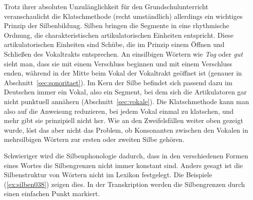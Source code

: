 Trotz ihrer absoluten Unzulänglichkeit für den Grundschulunterricht veranschaulicht die Klatschmethode (recht umständlich) allerdings ein wichtiges Prinzip der Silbenbildung.
Silben bringen die Segmente in eine rhythmische Ordnung, die charakteristischen artikulatorischen Einheiten entspricht.
Diese artikulatorischen Einheiten sind Schübe, die im Prinzip einem Öffnen und Schließen des Vokaltrakts entsprechen.
An einsilbigen Wörtern wie \textit{Tag} \textipa{[ta:k]} oder \textit{gut} \textipa{[gu:t]} sieht man, dass sie mit einem Verschluss beginnen und mit einem Verschluss enden, während in der Mitte beim Vokal der Vokaltrakt geöffnet ist (genauer in Abschnitt~\ref{sec:sonoritaet}).
Im Kern der Silbe befindet sich passend dazu im Deutschen immer ein Vokal, also ein Segment, bei dem sich die Artikulatoren gar nicht punktuell annähern (Abschnitt~\ref{sec:vokale}).
Die Klatschmethode kann man also auf die Anweisung reduzieren, bei jedem Vokal einmal zu klatschen, und mehr gibt sie prinzipiell nicht her.
Wie an den Zweifelsfällen weiter oben gezeigt wurde, löst das aber nicht das Problem, ob Konsonanten zwischen den Vokalen in mehrsilbigen Wörtern zur ersten oder zweiten Silbe gehören.

Schwieriger wird die Silbenphonologie dadurch, dass in den verschiedenen Formen eines Wortes die Silbengrenzen nicht immer konstant sind.
Anders gesagt ist die Silbenstruktur von Wörtern nicht im Lexikon festgelegt.
Die Beispiele (\ref{ex:silben038}) zeigen dies.
In der Transkription werden die Silbengrenzen durch einen einfachen Punkt markiert.

\begin{exe}
  \ex\label{ex:silben038}
  \begin{xlist}
  \end{xlist}
\end{exe}

